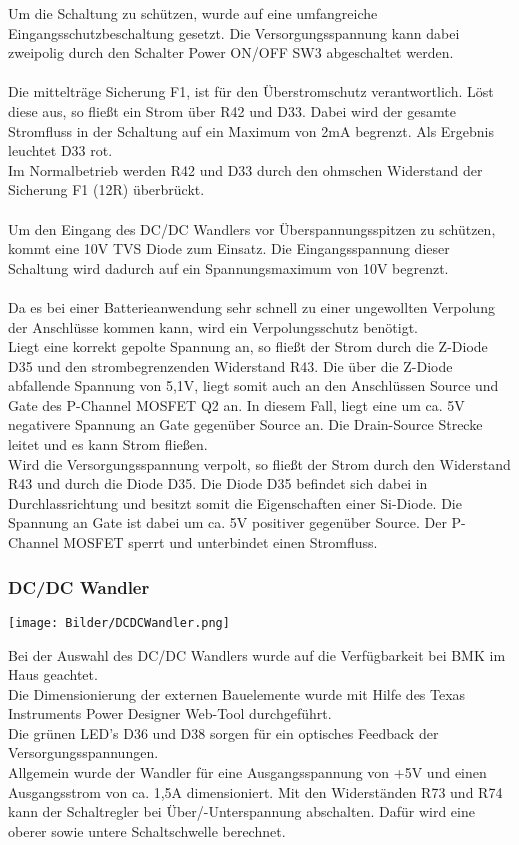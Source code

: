 \documentclass[a4paper,11pt]{scrartcl}
\begin{document}
Um die Schaltung zu schützen, wurde auf eine umfangreiche Eingangsschutzbeschaltung gesetzt. Die Versorgungsspannung kann dabei zweipolig durch den Schalter \glqq Power ON/OFF SW3 \grqq{} abgeschaltet werden.
\\
\\
Die mittelträge Sicherung F1, ist für den Überstromschutz verantwortlich. Löst diese aus, so fließt ein Strom über R42 und D33. Dabei wird der gesamte Stromfluss in der Schaltung auf ein Maximum von 2mA begrenzt. Als Ergebnis leuchtet D33 rot.
\\
Im Normalbetrieb werden R42 und D33 durch den ohmschen Widerstand der Sicherung F1 (12R) überbrückt.
\\
\\
Um den Eingang des DC/DC Wandlers vor Überspannungsspitzen zu schützen, kommt eine 10V TVS Diode zum Einsatz. Die Eingangsspannung dieser Schaltung wird dadurch auf ein Spannungsmaximum von 10V begrenzt. 
\\
\\
Da es bei einer Batterieanwendung sehr schnell zu einer ungewollten Verpolung der Anschlüsse kommen kann, wird ein Verpolungsschutz benötigt.
\\
Liegt eine korrekt gepolte Spannung an, so fließt der Strom durch die Z-Diode D35 und den strombegrenzenden Widerstand R43. Die über die Z-Diode abfallende Spannung von 5,1V, liegt somit auch an den Anschlüssen \glqq Source und Gate \grqq{} des P-Channel MOSFET Q2 an.
In diesem Fall, liegt eine um ca. 5V negativere Spannung an Gate gegenüber Source an. Die Drain-Source Strecke leitet und es kann Strom fließen.
\\ 
Wird die Versorgungsspannung verpolt, so fließt der Strom durch den Widerstand R43 und durch die Diode D35. Die Diode D35 befindet sich dabei in Durchlassrichtung und besitzt somit die Eigenschaften einer Si-Diode.
Die Spannung an Gate ist dabei um ca. 5V positiver gegenüber Source. Der P-Channel MOSFET sperrt und unterbindet einen Stromfluss.
\\

\subsubsection{DC/DC Wandler}

\begin{center}
\texttt{[image: Bilder/DCDCWandler.png]}
\end{center}

Bei der Auswahl des DC/DC Wandlers wurde auf die Verfügbarkeit bei BMK im Haus geachtet.
\\
Die Dimensionierung der externen Bauelemente wurde mit Hilfe des \glqq Texas Instruments Power Designer\grqq{} Web-Tool durchgeführt.
\\
Die grünen LED's D36 und D38 sorgen für ein optisches Feedback der Versorgungsspannungen.
\\
Allgemein wurde der Wandler für eine Ausgangsspannung von +5V und einen Ausgangsstrom von ca. 1,5A dimensioniert. Mit den Widerständen R73 und R74 kann der Schaltregler bei Über/-Unterspannung abschalten. Dafür wird eine oberer sowie untere Schaltschwelle berechnet.
\end{document}
